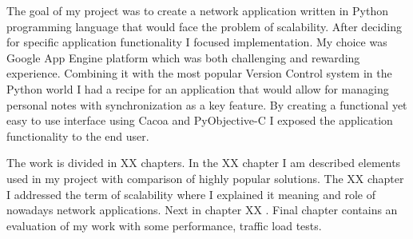 The goal of my project was to create a network application written in Python programming language that would face the problem of scalability. After deciding for specific application functionality I focused implementation. My choice was Google App Engine platform which was both challenging and rewarding experience. Combining it with the most popular Version Control system in the Python world I had a recipe for an application that would allow for managing personal notes with synchronization as a key feature. By creating a functional yet easy to use interface using Cacoa and PyObjective-C I exposed the application functionality to the end user.  

The work is divided in XX chapters. In the XX chapter I am described elements used  in my project with comparison of highly popular solutions. The XX chapter I addressed the term of scalability where I explained it meaning   and role of nowadays network applications. Next in chapter XX . Final chapter contains an evaluation of my work with some performance,  traffic load tests.